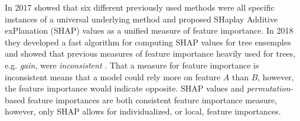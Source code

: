 In 2017 \citet{Lundberg:2017} showed that six different previously used methods were all specific instances of a universal underlying method and proposed SHaplay Additive exPlanation (SHAP) values as a unified measure of feature importance. In \num{2018} they developed a fast algorithm for computing SHAP values for tree ensemples and showed that previous measures of feature importance heavily used for trees, e.g. \emph{gain}, were \emph{inconsistent} \autocite{lundbergConsistentIndividualizedFeature2019}. That a measure for feature importance is inconsistent means that a model could rely more on feature $A$ than $B$, however, the feature importance would indicate opposite. SHAP values and \emph{permutation}-based feature importances are both consistent feature importance measure, however, only SHAP allows for individualized, or local, feature importances.  

